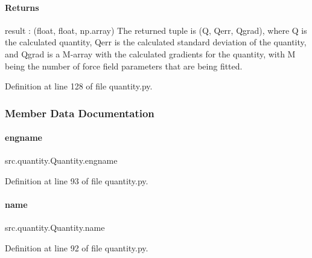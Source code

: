 \paragraph*{Returns }

result \+: (float, float, np.\+array) The returned tuple is (Q, Qerr, Qgrad), where Q is the calculated quantity, Qerr is the calculated standard deviation of the quantity, and Qgrad is a M-\/array with the calculated gradients for the quantity, with M being the number of force field parameters that are being fitted. 

Definition at line 128 of file quantity.\+py.



\subsubsection{Member Data Documentation}
\mbox{\label{classsrc_1_1quantity_1_1Quantity_a75c5d4731a158b9f1daade94193e4105}} 
\paragraph{\texorpdfstring{engname}{engname}}
{\footnotesize\ttfamily src.\+quantity.\+Quantity.\+engname}



Definition at line 93 of file quantity.\+py.

\mbox{\label{classsrc_1_1quantity_1_1Quantity_a88012f3c2a7b2adf06632d6910f21e83}} 
\paragraph{\texorpdfstring{name}{name}}
{\footnotesize\ttfamily src.\+quantity.\+Quantity.\+name}



Definition at line 92 of file quantity.\+py.

\mbox{\label{classsrc_1_1quantity_1_1Quantity_adf325119dc5139a5d664707336bc2e65}} 
